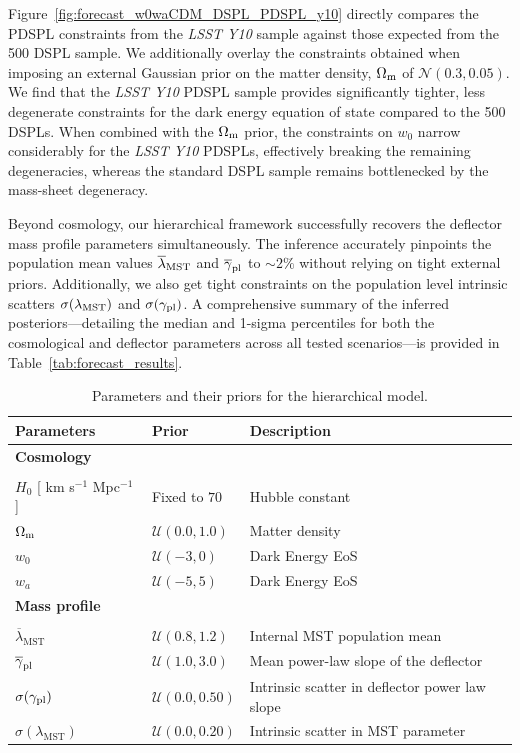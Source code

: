 \documentclass[a4paper,11pt]{article}
\begin{document}
Figure~\ref{fig:forecast_w0waCDM_DSPL_PDSPL_y10} directly compares the PDSPL constraints from the \emph{LSST Y10} sample against those expected from the 500 DSPL sample. We additionally overlay the constraints obtained when imposing an external Gaussian prior on the matter density, $\Omega_{\rm m}$ of $\mathcal{N}(0.3, 0.05)$. We find that the \emph{LSST Y10} PDSPL sample provides significantly tighter, less degenerate constraints for the dark energy equation of state compared to the 500 DSPLs. When combined with the $\Omega_{\rm m}$ prior, the constraints on $w_0$ narrow considerably for the \emph{LSST Y10} PDSPLs, effectively breaking the remaining degeneracies, whereas the standard DSPL sample remains bottlenecked by the mass-sheet degeneracy.

Beyond cosmology, our hierarchical framework successfully recovers the deflector mass profile parameters simultaneously. The inference accurately pinpoints the population mean values $\overline\lambda_{\rm MST}$ and $\overline\gamma_{\rm pl}$ to $\sim2\%$ without relying on tight external priors. Additionally, we also get tight constraints on the population level intrinsic scatters $\sigma(\lambda_{\rm MST})$ and $\sigma(\gamma_{\rm pl})$. A comprehensive summary of the inferred posteriors—detailing the median and 1-sigma percentiles for both the cosmological and deflector parameters across all tested scenarios—is provided in Table~\ref{tab:forecast_results}.



\begin{table}[h!]
\centering
\caption{Parameters and their priors for the hierarchical model.}\label{tab:forecast_priors}
\begin{tabular}{lll}
\toprule
\textbf{Parameters} & \textbf{Prior} & \textbf{Description} \\
\midrule
\multicolumn{3}{l}{\textbf{Cosmology}} \\\\
$H_0$ [ km s$^{-1}$ Mpc$^{-1}$ ] & Fixed to $70$ & Hubble constant \\
$\Omega_{\rm m}$ & $\mathcal{U}(0.0, 1.0)$ & Matter density \\
$w_0$ & $\mathcal{U}(-3, 0)$ & Dark Energy EoS \\
$w_a$ & $\mathcal{U}(-5, 5)$ & Dark Energy EoS \\
\midrule
\multicolumn{3}{l}{\textbf{Mass profile}} \\\\
$\overline\lambda_{\text{MST}}$ & $\mathcal{U}(0.8, 1.2)$ & Internal MST population mean \\
$\overline\gamma_{\rm pl}$ & $\mathcal{U}(1.0, 3.0)$ & Mean power-law slope of the deflector \\
$\sigma(\gamma_{\rm pl})$ & $\mathcal{U}(0.0, 0.50)$ & Intrinsic scatter in deflector power law slope \\
$\sigma(\lambda_{\text{MST}})$ & $\mathcal{U}(0.0, 0.20)$ & Intrinsic scatter in MST parameter \\
\bottomrule
\end{tabular}
\end{table}
\end{document}
